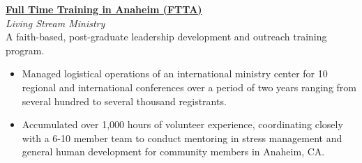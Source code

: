 \documentclass[letterpaper,6pt]{article}
\begin{document}
\vspace{3mm}
\href{https://www.ftta.org}{\textbf{Full Time Training in Anaheim (FTTA)}} \\
\textit{Living Stream Ministry} \\
A faith-based, post-graduate leadership development and outreach training program.
\vspace{1mm}
\begin{itemize}[itemsep=0.5mm,topsep=0pt]
    \item  Managed logistical operations of an international ministry center for 10 
    regional and international conferences over a period of two years ranging from several 
    hundred to several thousand registrants.
\end{itemize}
\begin{itemize}[itemsep=0.5mm,topsep=0pt]
    \item  Accumulated over 1,000 hours of volunteer experience, coordinating closely 
    with a 6-10 member team to conduct mentoring in stress management and general human 
    development for community members in Anaheim, CA.
\end{itemize}
\end{document}

